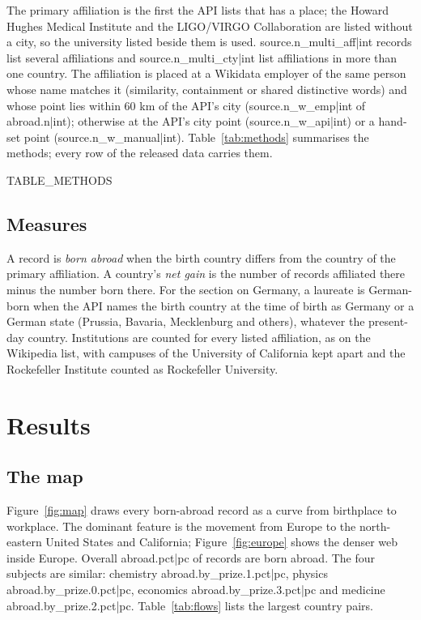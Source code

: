 \documentclass[11pt,a4paper]{article}
\begin{document}
The primary affiliation is the first the API lists that has a place; the Howard Hughes Medical Institute and the LIGO/VIRGO Collaboration are listed without a city, so the university listed beside them is used. {{source.n_multi_aff|int}} records list several affiliations and {{source.n_multi_cty|int}} list affiliations in more than one country. The affiliation is placed at a Wikidata employer of the same person whose name matches it (similarity, containment or shared distinctive words) and whose point lies within 60 km of the API's city ({{source.n_w_emp|int}} of {{abroad.n|int}}); otherwise at the API's city point ({{source.n_w_api|int}}) or a hand-set point ({{source.n_w_manual|int}}). Table~\ref{tab:methods} summarises the methods; every row of the released data carries them.

{{TABLE_METHODS}}

\subsection{Measures}
A record is \emph{born abroad} when the birth country differs from the country of the primary affiliation. A country's \emph{net gain} is the number of records affiliated there minus the number born there. For the section on Germany, a laureate is German-born when the API names the birth country at the time of birth as Germany or a German state (Prussia, Bavaria, Mecklenburg and others), whatever the present-day country. Institutions are counted for every listed affiliation, as on the Wikipedia list, with campuses of the University of California kept apart and the Rockefeller Institute counted as Rockefeller University.

\section{Results}
\subsection{The map}
Figure~\ref{fig:map} draws every born-abroad record as a curve from birthplace to workplace. The dominant feature is the movement from Europe to the north-eastern United States and California; Figure~\ref{fig:europe} shows the denser web inside Europe. Overall {{abroad.pct|pc}} of records are born abroad. The four subjects are similar: chemistry {{abroad.by_prize.1.pct|pc}}, physics {{abroad.by_prize.0.pct|pc}}, economics {{abroad.by_prize.3.pct|pc}} and medicine {{abroad.by_prize.2.pct|pc}}. Table~\ref{tab:flows} lists the largest country pairs.
\end{document}
